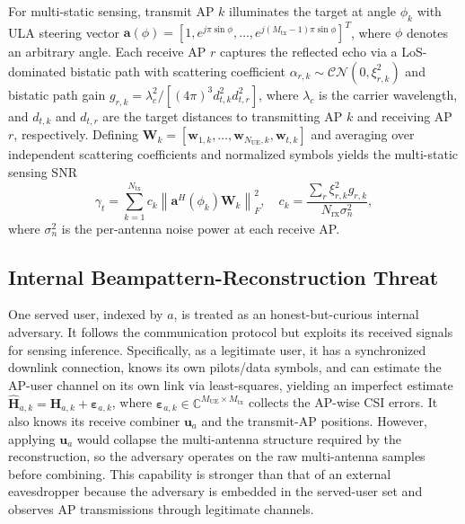 \documentclass[lettersize,journal]{IEEEtran}
\begin{document}
For multi-static sensing, transmit AP $k$ illuminates the target at angle $\phi_k$ with ULA steering vector $\mathbf{a}(\phi)=[1,e^{j\pi\sin\phi},\ldots,e^{j(M_{\mathrm{tx}}-1)\pi\sin\phi}]^T$, where $\phi$ denotes an arbitrary angle. Each receive AP $r$ captures the reflected echo via a LoS-dominated bistatic path with scattering coefficient $\alpha_{r,k}\sim\mathcal{CN}(0,\xi_{r,k}^2)$ and bistatic path gain $g_{r,k}=\lambda_c^2/[(4\pi)^3 d_{t,k}^2 d_{t,r}^2]$, where $\lambda_c$ is the carrier wavelength, and $d_{t,k}$ and $d_{t,r}$ are the target distances to transmitting AP $k$ and receiving AP $r$, respectively. Defining $\mathbf{W}_k=[\mathbf{w}_{1,k},\ldots,\mathbf{w}_{N_{\mathrm{UE}},k},\mathbf{w}_{t,k}]$ and averaging over independent scattering coefficients and normalized symbols yields the multi-static sensing SNR
\begin{equation}
\gamma_t=\sum_{k=1}^{N_{\mathrm{tx}}}c_k\left\|\mathbf{a}^H(\phi_k)\mathbf{W}_k\right\|_F^2,\quad c_k=\frac{\sum_{r}\xi_{r,k}^2 g_{r,k}}{N_{\mathrm{rx}}\sigma_n^2},
\label{eq:snr-sensing}
\end{equation}
where $\sigma_n^2$ is the per-antenna noise power at each receive AP.

\subsection{Internal Beampattern-Reconstruction Threat}
\label{subsec:threat}
One served user, indexed by $a$, is treated as an honest-but-curious internal adversary. It follows the communication protocol but exploits its received signals for sensing inference. Specifically, as a legitimate user, it has a synchronized downlink connection, knows its own pilots/data symbols, and can estimate the AP-user channel on its own link via least-squares, yielding an imperfect estimate $\widehat{\mathbf{H}}_{a,k}=\mathbf{H}_{a,k}+\boldsymbol{\varepsilon}_{a,k}$, where $\boldsymbol{\varepsilon}_{a,k}\in\mathbb{C}^{M_{\mathrm{UE}}\times M_{\mathrm{tx}}}$ collects the AP-wise CSI errors. It also knows its receive combiner $\mathbf{u}_a$ and the transmit-AP positions. However, applying $\mathbf{u}_a$ would collapse the multi-antenna structure required by the reconstruction, so the adversary operates on the raw multi-antenna samples before combining. This capability is stronger than that of an external eavesdropper because the adversary is embedded in the served-user set and observes AP transmissions through legitimate channels.
\end{document}
